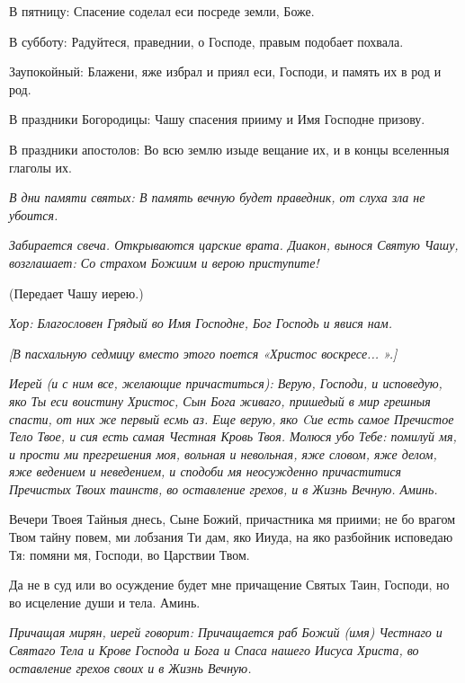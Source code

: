   В пятницу:\normalfont{} Спасение соделал еси посреде земли, Боже. \itshape 


  В субботу:\normalfont{} Радуйтеся, праведнии, о Господе, правым подобает похвала. \itshape 


  Заупокойный:\normalfont{} Блажени, яже избрал и приял еси, Господи, и память их в род и род. \itshape 


  В праздники Богородицы:\normalfont{} Чашу спасения прииму и Имя Господне призову. \itshape 


  В праздники апостолов:\normalfont{} Во всю землю изыде вещание их, и в концы вселенныя глаголы их. 


\itshape В дни памяти святых:\normalfont{} В память вечную будет праведник, от слуха зла не убоится. 


\itshape   Забирается свеча\normalfont{}. \itshape  Открываются царские врата. Диакон, вынося Святую Чашу, возглашает: Со страхом Божиим и верою приступите! 


  (Передает Чашу иерею.) \normalfont{}


\itshape Хор:\normalfont{} Благословен Грядый во Имя Господне, Бог Господь и явися нам.


\itshape [В пасхальную седмицу вместо этого поется «Христос воскресе... ».]\normalfont{}


\itshape  Иерей (и с ним все, желающие причаститься):\normalfont{} Верую, Господи, и исповедую, яко Ты еси воистину Христос, Сын Бога живаго, пришедый в мир грешныя спасти, от них же первый есмь аз. Еще верую, яко Cие есть самое Пречистое Тело Твое, и сия есть самая Честная Кровь Твоя. Молюся убо Тебе: помилуй мя, и прости ми прегрешения моя, вольная и невольная, яже словом, яже делом, яже ведением и неведением, и сподоби мя неосужденно причаститися Пречистых Твоих таинств, во оставление грехов, и в Жизнь Вечную. Аминь.


  Вечери Твоея Тайныя днесь, Сыне Божий, причастника мя приими; не бо врагом Твом тайну повем, ми лобзания Ти дам, яко Ииуда, на яко разбойник исповедаю Тя: помяни мя, Господи, во Царствии Твом.


  Да не в суд или во осуждение будет мне причащение Святых Таин, Господи, но во исцеление души и тела. Аминь.


\medskip 


\itshape  Причащая мирян, иерей говори\normalfont{}т: Причащается раб Божий (имя) Честнаго и Святаго Тела и Крове Господа и Бога и Спаса нашего Иисуса Христа, во оставление грехов своих и в Жизнь Вечную. 


